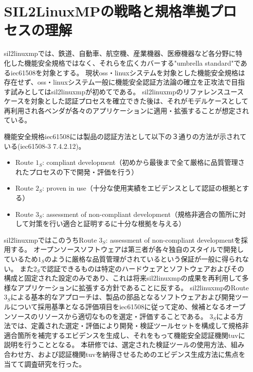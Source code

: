 \section{SIL2LinuxMPの戦略と規格準拠プロセスの理解}
\acrshort{sil2linuxmp}では、鉄道、自動車、航空機、産業機器、医療機器など各分野に特化した機能安全規格ではなく、それらを広くカバーする"umbrella standard"である\acrshort{iec61508}を対象とする。
現状\acrshort{oss}・\acrshort{linux}システムを対象とした機能安全規格は存在せず、\acrshort{oss}・\acrshort{linux}システム一般に機能安全認証方法論の確立を正攻法で目指す試みとしては\acrshort{sil2linuxmp}が初めてである。
\acrshort{sil2linuxmp}のリファレンスユースケースを対象とした認証プロセスを確立できた後は、それがモデルケースとして再利用され各ベンダが各々のアプリケーションに適用・拡張することが想定されている。
\par
機能安全規格\acrshort{iec61508}には製品の認証方法として以下の３通りの方法が示されている(\acrshort{iec61508}-3 7.4.2.12)。
\begin{itemize}
\label{3route}
  \item Route $1_S$: compliant development（初めから最後まで全て厳格に品質管理されたプロセスの下で開発・評価を行う）
  \item Route $2_S$: proven in use（十分な使用実績をエビデンスとして認証の根拠とする）
  \item Route $3_S$: assessment of non-compliant development（規格非適合の箇所に対して対策を行い適合と証明するに十分な根拠を与える）
\end{itemize}
\par
\acrshort{sil2linuxmp}ではこのうちRoute \textbf{$3_S$}: assessment of non-compliant developmentを採用する。
オープンソースソフトウェアは第三者が各々独自のスタイルで開発しているため$1_S$のように厳格な品質管理がされているという保証が一般に得られない。
また$2_S$で認証できるものは特定のハードウェアとソフトウェアおよびその構成と固定された設定のみであり、これは将来\acrshort{sil2linuxmp}の成果を再利用して多様なアプリケーションに拡張する方針であることに反する。
\acrshort{sil2linuxmp}のRoute $3_S$による基本的なアプローチは、製品の部品となるソフトウェアおよび開発ツールについて採用基準となる評価項目を\acrshort{iec61508}に従って定め、候補となるオープンソースのリソースから適切なものを選定・評価することである。
$3_S$による方法では、定義された選定・評価により開発・検証ツールセットを構成して規格非適合箇所を補完するエビデンスを生成し、それをもって機能安全認証機関\acrshort{tuv}に説明を行うこととなる。
本研修では、選定された検証ツールの使用方法、組み合わせ方、および認証機関\acrshort{tuv}を納得させるためのエビデンス生成方法に焦点を当てて調査研究を行った。

